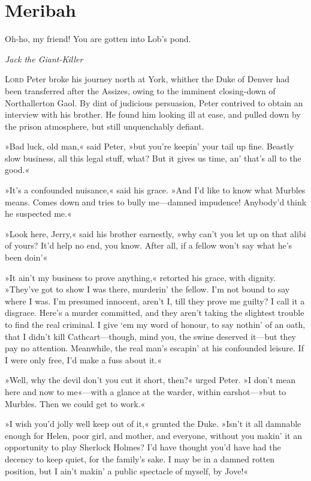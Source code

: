 
\chapter{Meribah}

\epigraph{Oh-ho, my friend! You are gotten into Lob's pond.}{\textit{Jack the Giant-Killer}}


\lettrine[lines=4]{L}{ord} Peter broke his journey north at York, whither the Duke of Denver had been transferred after the Assizes, owing to the imminent closing-down of Northallerton Gaol. By dint of judicious persuasion, Peter contrived to obtain an interview with his brother. He found him looking ill at ease, and pulled down by the prison atmosphere, but still unquenchably defiant.

»Bad luck, old man,« said Peter, »but you're keepin' your tail up fine. Beastly slow business, all this legal stuff, what? But it gives us time, an' that's all to the good.«

»It's a confounded nuisance,« said his grace. »And I'd like to know what Murbles means. Comes down and tries to bully me—damned impudence! Anybody'd think he suspected me.«

»Look here, Jerry,« said his brother earnestly, »why can't you let up on that alibi of yours? It'd help no end, you know. After all, if a fellow won't say what he's been doin'\longdash«

»It ain't my business to prove anything,« retorted his grace, with dignity. »They've got to show I was there, murderin' the fellow. I'm not bound to say where I was. I'm presumed innocent, aren't I, till they prove me guilty? I call it a disgrace. Here's a murder committed, and they aren't taking the slightest trouble to find the real criminal. I give `em my word of honour, to say nothin' of an oath, that I didn't kill Cathcart—though, mind you, the swine deserved it—but they pay no attention. Meanwhile, the real man's escapin' at his confounded leisure. If I were only free, I'd make a fuss about it.«

»Well, why the devil don't you cut it short, then?« urged Peter. »I don't mean here and now to me«—with a glance at the warder, within earshot—»but to Murbles. Then we could get to work.«

»I wish you'd jolly well keep out of it,« grunted the Duke. »Isn't it all damnable enough for Helen, poor girl, and mother, and everyone, without you makin' it an opportunity to play Sherlock Holmes? I'd have thought you'd have had the decency to keep quiet, for the family's sake. I may be in a damned rotten position, but I ain't makin' a public spectacle of myself, by Jove!«


